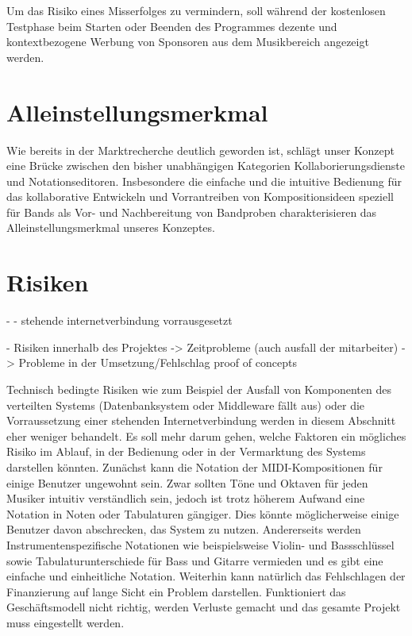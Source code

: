 \documentclass[12pt]{scrartcl}
\begin{document}
Um das Risiko eines Misserfolges zu vermindern, soll während der kostenlosen Testphase beim Starten oder Beenden des Programmes dezente und kontextbezogene Werbung von Sponsoren aus dem Musikbereich angezeigt werden.



\section{Alleinstellungsmerkmal}

Wie bereits in der Marktrecherche deutlich geworden ist, schlägt unser Konzept eine Brücke zwischen den bisher unabhängigen Kategorien Kollaborierungsdienste und Notationseditoren. Insbesondere die einfache und die intuitive Bedienung für das kollaborative Entwickeln und Vorrantreiben von Kompositionsideen speziell für Bands als Vor- und Nachbereitung von Bandproben charakterisieren das Alleinstellungsmerkmal unseres Konzeptes.


\section{Risiken}


- 
- stehende internetverbindung vorrausgesetzt

- Risiken innerhalb des Projektes
-> Zeitprobleme (auch ausfall der mitarbeiter)
-> Probleme in der Umsetzung/Fehlschlag proof of concepts


Technisch bedingte Risiken wie zum Beispiel der Ausfall von Komponenten des verteilten Systems (Datenbanksystem oder Middleware fällt aus) oder die Vorraussetzung einer stehenden Internetverbindung werden in diesem Abschnitt eher weniger behandelt. Es soll mehr darum gehen, welche Faktoren ein mögliches Risiko im Ablauf, in der Bedienung oder in der Vermarktung des Systems darstellen könnten.
Zunächst kann die Notation der MIDI-Kompositionen für einige Benutzer ungewohnt sein. Zwar sollten Töne und Oktaven für jeden Musiker intuitiv verständlich sein, jedoch ist trotz höherem Aufwand eine Notation in Noten oder Tabulaturen gängiger. Dies könnte möglicherweise einige Benutzer davon abschrecken, das System zu nutzen. Andererseits werden Instrumentenspezifische Notationen wie beispielsweise Violin- und Bassschlüssel sowie Tabulaturunterschiede für Bass und Gitarre vermieden und es gibt eine einfache und einheitliche Notation.
Weiterhin kann natürlich das Fehlschlagen der Finanzierung auf lange Sicht ein Problem darstellen. Funktioniert das Geschäftsmodell nicht richtig, werden Verluste gemacht und das gesamte Projekt muss eingestellt werden.
\end{document}

